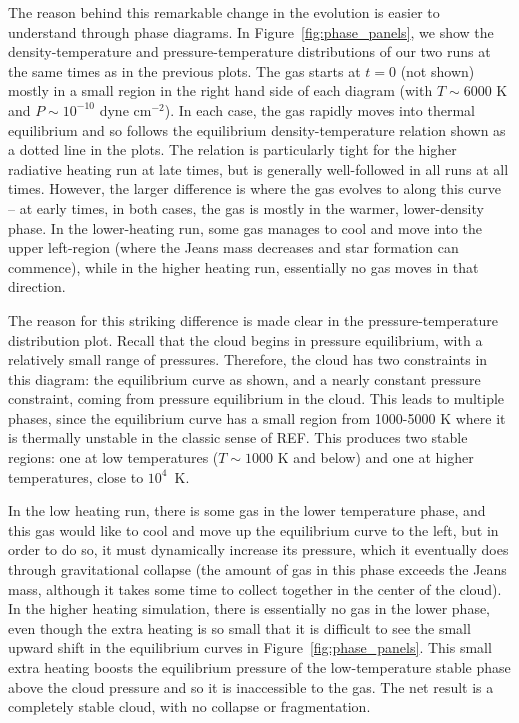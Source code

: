 \documentclass[useAMS,usenatbib]{mn2e}
\begin{document}
The reason behind this remarkable change in the evolution is easier to understand through phase diagrams.  In Figure~\ref{fig:phase_panels}, we show the density-temperature
and pressure-temperature distributions of our two runs at the same times as in the previous plots.  The gas starts at $t=0$ (not shown) mostly in a
small region in the right hand side of each diagram (with $T \sim 6000$ K and $P \sim 10^{-10}$ dyne cm$^{-2}$).  In each case, the gas rapidly moves
into thermal equilibrium and so follows the equilibrium density-temperature relation shown as a dotted line in the plots. The relation is particularly
tight for the higher radiative heating run at late times, but is generally well-followed in all runs at all times. However, the larger difference is
where the gas evolves to along this curve -- at early times, in both cases, the gas is mostly in the warmer, lower-density phase. In the lower-heating
run, some gas manages to cool and move into the upper left-region (where the Jeans mass decreases and star formation can commence), while in the higher
heating run, essentially no gas moves in that direction.  

The reason for this striking difference is made clear in the pressure-temperature distribution plot.  Recall that the cloud begins in pressure equilibrium, with a relatively small range of pressures.  Therefore, the cloud has two constraints in this diagram: the equilibrium curve as shown, and a nearly constant pressure constraint, coming from pressure equilibrium in the cloud.  This leads to multiple phases, since the equilibrium curve has a small region from 1000-5000 K where it is thermally unstable in the classic sense of REF.  This produces two stable regions: one at low temperatures ($T \sim 1000$ K and below) and one at higher temperatures, close to $10^4$~K.   

In the low heating run, there is some gas in the lower temperature phase, and this gas would like to cool and move up the equilibrium curve to the left, but in order to do so, it must dynamically increase its pressure, which it eventually does through gravitational collapse (the amount of gas in this phase exceeds the Jeans mass, although it takes some time to collect together in the center of the cloud).  In the higher heating simulation, there is essentially no gas in the lower phase, even though the extra heating is so small that it is difficult to see the small upward shift in the equilibrium curves in Figure~\ref{fig:phase_panels}.  This small extra heating boosts the equilibrium pressure of the low-temperature stable phase above the cloud pressure and so it is inaccessible to the gas.  The net result is a completely stable cloud, with no collapse or fragmentation.
\end{document}
